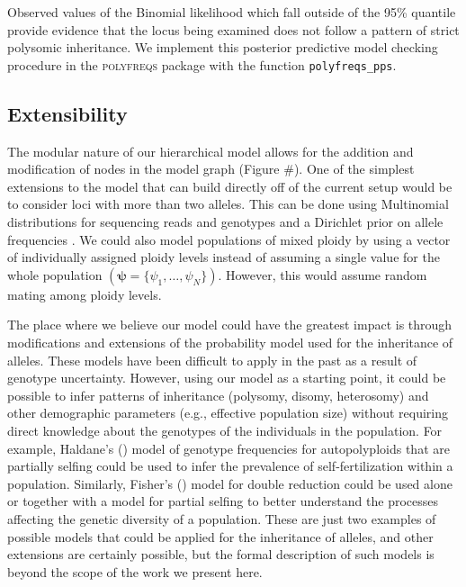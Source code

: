 \documentclass[11pt,english,letterpaper,oneside]{article}
\begin{document}
Observed values of the Binomial likelihood which fall outside of the 95\% quantile provide evidence that the locus being examined does not follow a pattern of strict polysomic inheritance. We implement this posterior predictive model checking procedure in the \textsc{polyfreqs} package with the function \texttt{polyfreqs\_pps}.

\medskip
\subsection*{Extensibility}
\medskip

The modular nature of our hierarchical model allows for the addition and modification of nodes in the model graph (Figure \#). One of the simplest extensions to the model that can build directly off of the current setup would be to consider loci with more than two alleles. This can be done using Multinomial distributions for sequencing reads and genotypes and a Dirichlet prior on allele frequencies \citep[the Multinomial and Dirichlet distributions form a conjugate family;][]{gelman2014bayesian}. We could also model populations of mixed ploidy by using a vector of individually assigned ploidy levels instead of assuming a single value for the whole population $(\bm{\psi} = \{\psi_1,\ldots,\psi_N\})$. However, this would assume random mating among ploidy levels.
\medskip

The place where we believe our model could have the greatest impact is through modifications and extensions of the probability model used for the inheritance of alleles. These models have been difficult to apply in the past as a result of genotype uncertainty. However, using our model as a starting point, it could be possible to infer patterns of inheritance (polysomy, disomy, heterosomy) and other demographic parameters (e.g., effective population size) without requiring direct knowledge about the genotypes of the individuals in the population. For example, Haldane's (\citeyear{haldane1930autopolyploids}) model of genotype frequencies for autopolyploids that are partially selfing could be used to infer the prevalence of self-fertilization within a population. Similarly, Fisher's (\citeyear{fisher1943doublereduction}) model for double reduction could be used alone or together with a model for partial selfing to better understand the processes affecting the genetic diversity of a population. These are just two examples of possible models that could be applied for the inheritance of alleles, and other extensions are certainly possible, but the formal description of such models is beyond the scope of the work we present here.
\medskip
\end{document}

